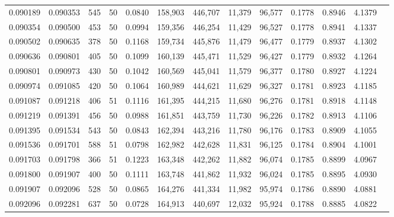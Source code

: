 \begin{tabular}{rrrrrrrrrrrrr}
0.090189 & 0.090353 &   545 &  50 &                                     0.0840 & 158,903 & 446,707 &  11,379 &  96,577 & 0.1778 & 0.8946 & 4.1379 \\
0.090354 & 0.090500 &   453 &  50 &                                     0.0994 & 159,356 & 446,254 &  11,429 &  96,527 & 0.1778 & 0.8941 & 4.1337 \\
0.090502 & 0.090635 &   378 &  50 &                                     0.1168 & 159,734 & 445,876 &  11,479 &  96,477 & 0.1779 & 0.8937 & 4.1302 \\
0.090636 & 0.090801 &   405 &  50 &                                     0.1099 & 160,139 & 445,471 &  11,529 &  96,427 & 0.1779 & 0.8932 & 4.1264 \\
0.090801 & 0.090973 &   430 &  50 &                                     0.1042 & 160,569 & 445,041 &  11,579 &  96,377 & 0.1780 & 0.8927 & 4.1224 \\
0.090974 & 0.091085 &   420 &  50 &                                     0.1064 & 160,989 & 444,621 &  11,629 &  96,327 & 0.1781 & 0.8923 & 4.1185 \\
0.091087 & 0.091218 &   406 &  51 &                                     0.1116 & 161,395 & 444,215 &  11,680 &  96,276 & 0.1781 & 0.8918 & 4.1148 \\
0.091219 & 0.091391 &   456 &  50 &                                     0.0988 & 161,851 & 443,759 &  11,730 &  96,226 & 0.1782 & 0.8913 & 4.1106 \\
0.091395 & 0.091534 &   543 &  50 &                                     0.0843 & 162,394 & 443,216 &  11,780 &  96,176 & 0.1783 & 0.8909 & 4.1055 \\
0.091536 & 0.091701 &   588 &  51 &                                     0.0798 & 162,982 & 442,628 &  11,831 &  96,125 & 0.1784 & 0.8904 & 4.1001 \\
0.091703 & 0.091798 &   366 &  51 &                                     0.1223 & 163,348 & 442,262 &  11,882 &  96,074 & 0.1785 & 0.8899 & 4.0967 \\
0.091800 & 0.091907 &   400 &  50 &                                     0.1111 & 163,748 & 441,862 &  11,932 &  96,024 & 0.1785 & 0.8895 & 4.0930 \\
0.091907 & 0.092096 &   528 &  50 &                                     0.0865 & 164,276 & 441,334 &  11,982 &  95,974 & 0.1786 & 0.8890 & 4.0881 \\
0.092096 & 0.092281 &   637 &  50 &                                     0.0728 & 164,913 & 440,697 &  12,032 &  95,924 & 0.1788 & 0.8885 & 4.0822 \\

\end{tabular}
